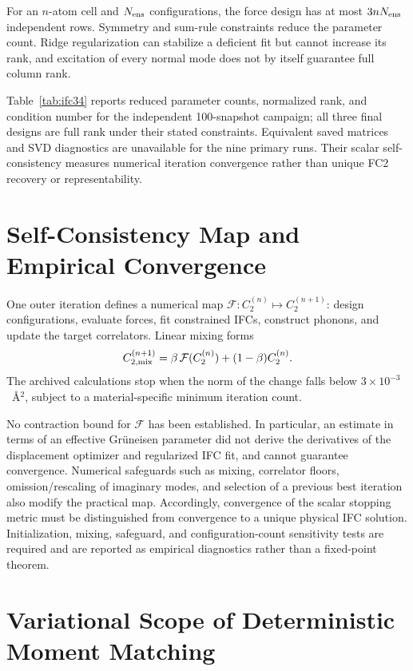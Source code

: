 \documentclass[aps,prb,reprint,amsmath,amssymb,floatfix]{revtex4-2}
\begin{document}
For an \(n\)-atom cell and \(N_{\rm ens}\) configurations, the force design has
at most \(3nN_{\rm ens}\) independent rows. Symmetry and sum-rule constraints
reduce the parameter count. Ridge regularization can stabilize a deficient fit
but cannot increase its rank, and excitation of every normal mode does not by
itself guarantee full column rank.

Table~\ref{tab:ifc34} reports reduced parameter counts, normalized rank, and
condition number for the independent 100-snapshot campaign; all three final
designs are full rank under their stated constraints. Equivalent saved matrices
and SVD diagnostics are unavailable for the nine primary runs. Their scalar
self-consistency measures numerical iteration convergence rather than unique
FC2 recovery or representability.

\section{Self-Consistency Map and Empirical Convergence}
\label{appendix-f-self-consistency-fixed-point-analysis-and-convergence}

One outer iteration defines a numerical map
\(\mathcal F:C_2^{(n)}\mapsto C_2^{(n+1)}\): design configurations,
evaluate forces, fit constrained IFCs, construct phonons, and update the target
correlators. Linear mixing forms
\[
C_{2,\rm mix}^{(n+1)}
=\beta\,\mathcal F(C_2^{(n)})+(1-\beta)C_2^{(n)} .
\]
The archived calculations stop when the norm of the change falls below
\(3\times10^{-3}\)~Å\(^2\), subject to a material-specific minimum iteration
count.

No contraction bound for \(\mathcal F\) has been established. In particular,
an estimate in terms of an effective Gr\"uneisen parameter did not
derive the derivatives of the displacement optimizer and regularized IFC fit,
and cannot guarantee convergence. Numerical safeguards such as mixing,
correlator floors, omission/rescaling of imaginary modes, and selection of a
previous best iteration also modify the practical map. Accordingly,
convergence of the scalar stopping metric must be distinguished from
convergence to a unique physical IFC solution. Initialization, mixing,
safeguard, and configuration-count sensitivity tests are required and are
reported as empirical diagnostics rather than a fixed-point theorem.

\section{Variational Scope of Deterministic Moment Matching}
\label{appendix-g-variational-scope-of-deterministic-moment-matching}
\end{document}
